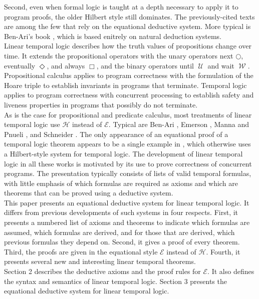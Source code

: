 \documentclass[fleqn, leqno]{article}
\newcommand{\Until}{\;\mathcal{U}\;}
\newcommand{\Wait}{\;\mathcal{W}\;}
\newcommand{\Next}{\bigcirc}
\newcommand{\Event}{\Diamond}
\newcommand{\Always}{\Box}
\begin{document}
Second, even when formal logic is taught at a depth necessary to apply it to program proofs, the older Hilbert style
still dominates.
The previously-cited texts \cite{Cohen, LADM, Kald} are among the few that rely on the equational deductive system. 
More typical is Ben-Ari's book \cite{Ben}, which is based enitrely on natural deduction systems.\\

Linear temporal logic describes how the truth values of propositions change over time.
It extends the propositional operators with the unary operators next $\Next$, eventually $\Event$, and always $\Always$,
and the binary operators until $\Until$ and wait $\Wait$.
Propositional calculus applies to program correctness with the formulation of the Hoare triple to establish invariants
in programs that terminate.
Temporal logic applies to program correctness with concurrent processing to establish safety and liveness properties
in programs that possibly do not terminate.\\

As is the case for propositional and predicate calculus, most treatments of linear temporal logic use $\mathcal{H}$
instead of $\mathcal{E}$. Typical are Ben-Ari \cite{Ben2}, Emerson \cite{Emer}, Manna and Pnueli \cite{Manna}, and 
Schneider \cite{Schn}.
The only appearance of an equational proof of a temporal logic theorem appears to be a single example in \cite{Schn},
which otherwise uses a Hilbert-style system for temporal logic.
The development of linear temporal logic in all these works is motivated by its use to prove correctness of concurrent programs.
The presentation typically consists of lists of valid temporal formulas, with little emphasis of which formulas are required
as axioms and which are theorems that can be proved using a deductive system.\\

This paper presents an equational deductive system for linear temporal logic.
It differs from previous developments of such systems in four respects.
First, it presents a numbered list of axioms and theorems to indicate which formulas are assumed, which formulas are
derived, and for those that are derived, which previous formulas they depend on.
Second, it gives a proof of every theorem.
Third, the proofs are given in the equational style $\mathcal{E}$ instead of $\mathcal{H}$.
Fourth, it presents several new and interesting linear temporal theorems.\\

Section 2 describes the deductive axioms and the proof rules for $\mathcal{E}$.
It also defines the syntax and semantics of linear temporal logic.
Section 3 presents the equational deductive system for linear temporal logic.\\
\end{document}
